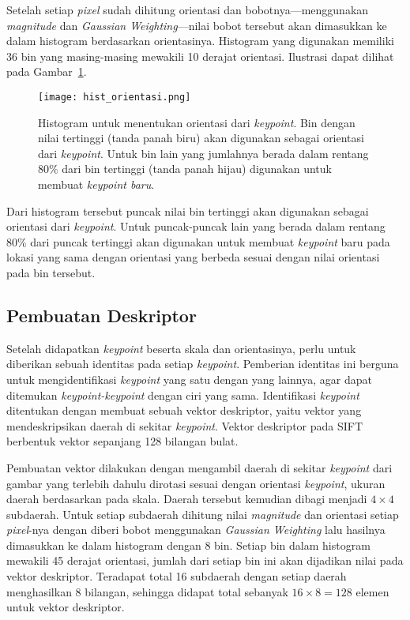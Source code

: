 Setelah setiap \textit{pixel} sudah dihitung orientasi dan bobotnya---menggunakan \textit{magnitude} dan \textit{Gaussian Weighting}---nilai bobot tersebut akan dimasukkan ke dalam histogram berdasarkan orientasinya. Histogram yang digunakan memiliki 36 bin yang masing-masing mewakili 10 derajat orientasi. Ilustrasi dapat dilihat pada Gambar~\ref{fig:hist_orientasi}.
\begin{figure}[H]
	\centering
	\texttt{[image: hist\_orientasi.png]}
	\caption{Histogram untuk menentukan orientasi dari \textit{keypoint}. Bin dengan nilai tertinggi (tanda panah biru) akan digunakan sebagai orientasi dari \textit{keypoint}. Untuk bin lain yang jumlahnya berada dalam rentang $80\%$ dari bin tertinggi (tanda panah hijau) digunakan untuk membuat \textit{keypoint baru}.}
	\label{fig:hist_orientasi}
\end{figure}

Dari histogram tersebut puncak nilai bin tertinggi akan digunakan sebagai orientasi dari \textit{keypoint}. Untuk puncak-puncak lain yang berada dalam rentang $80\%$ dari puncak tertinggi akan digunakan untuk membuat \textit{keypoint} baru pada lokasi yang sama dengan orientasi yang berbeda sesuai dengan nilai orientasi pada bin tersebut.

\subsection{Pembuatan Deskriptor}
Setelah didapatkan \textit{keypoint} beserta skala dan orientasinya, perlu untuk diberikan sebuah identitas pada setiap \textit{keypoint}. Pemberian identitas ini berguna untuk mengidentifikasi \textit{keypoint} yang satu dengan yang lainnya, agar dapat ditemukan \textit{keypoint-keypoint} dengan ciri yang sama. Identifikasi \textit{keypoint} ditentukan dengan membuat sebuah vektor deskriptor, yaitu vektor yang mendeskripsikan daerah di sekitar \textit{keypoint}. Vektor deskriptor pada SIFT berbentuk vektor sepanjang 128 bilangan bulat.

Pembuatan vektor dilakukan dengan mengambil daerah di sekitar \textit{keypoint} dari gambar yang terlebih dahulu dirotasi sesuai dengan orientasi \textit{keypoint}, ukuran daerah berdasarkan pada skala. Daerah tersebut kemudian dibagi menjadi $4\times4$ subdaerah. Untuk setiap subdaerah dihitung nilai \textit{magnitude} dan orientasi setiap \textit{pixel}-nya dengan diberi bobot menggunakan \textit{Gaussian Weighting} lalu hasilnya dimasukkan ke dalam histogram dengan 8 bin. Setiap bin dalam histogram mewakili 45 derajat orientasi, jumlah dari setiap bin ini akan dijadikan nilai pada vektor deskriptor. Teradapat total 16 subdaerah dengan setiap daerah menghasilkan 8 bilangan, sehingga didapat total sebanyak $16\times8=128$ elemen untuk vektor deskriptor. 

